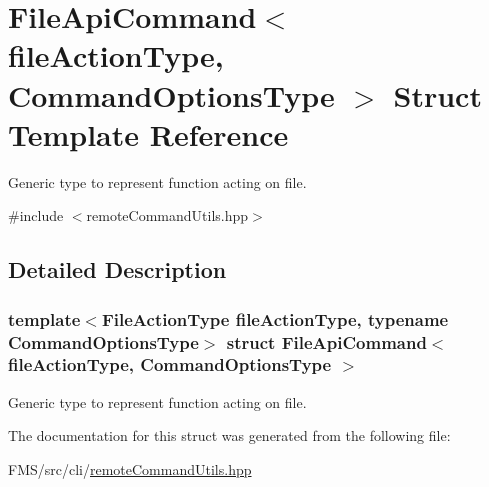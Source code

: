 \hypertarget{structFileApiCommand}{
\section{FileApiCommand$<$ fileActionType, CommandOptionsType $>$ Struct Template Reference}
\label{structFileApiCommand}
}


Generic type to represent function acting on file.  




{\ttfamily \#include $<$remoteCommandUtils.hpp$>$}



\subsection{Detailed Description}
\subsubsection*{template$<$FileActionType fileActionType, typename CommandOptionsType$>$ struct FileApiCommand$<$ fileActionType, CommandOptionsType $>$}

Generic type to represent function acting on file. 

The documentation for this struct was generated from the following file:\begin{DoxyCompactItemize}
\item 
FMS/src/cli/\hyperlink{remoteCommandUtils_8hpp}{remoteCommandUtils.hpp}\end{DoxyCompactItemize}
